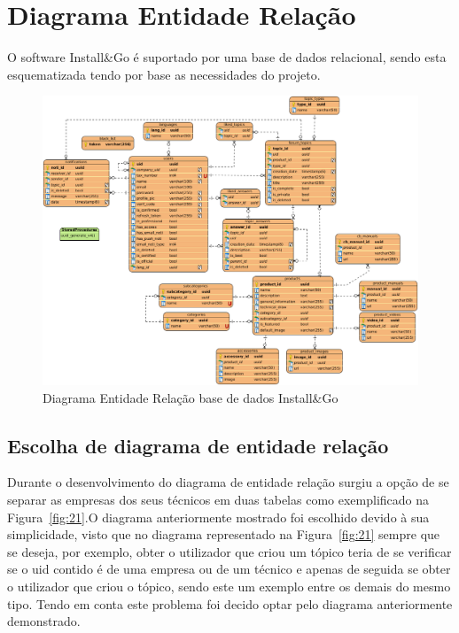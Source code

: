 \section{Diagrama Entidade Relação}

O software Install\&Go é suportado por uma base de dados relacional, 
sendo esta esquematizada tendo por base as necessidades do projeto.

\begin{figure}[htb]
    \centering
    
    \includegraphics[width=\textwidth]{images/diagramas/diagrama_bd.png}
    \caption{Diagrama Entidade Relação base de dados Install\&Go}
    \label{fig:20}
\end{figure}

\newpage

\subsection{Escolha de diagrama de entidade relação}
Durante o desenvolvimento do diagrama de entidade relação surgiu 
a opção de se separar as empresas dos seus técnicos em duas tabelas como 
exemplificado na Figura~\ref{fig:21}.O diagrama anteriormente 
mostrado foi escolhido devido à sua simplicidade, 
visto que no diagrama representado na Figura~\ref{fig:21} sempre que se
deseja, por exemplo, obter o utilizador que criou um tópico teria de se
verificar se o uid contido é de uma empresa ou de um técnico e apenas 
de seguida se obter o utilizador que criou o tópico, sendo este um exemplo
entre os demais do mesmo tipo. Tendo em conta este problema foi decido optar
pelo diagrama anteriormente demonstrado.

